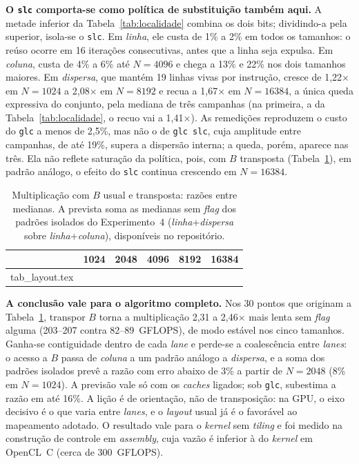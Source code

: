 \documentclass[12pt]{article}
\makeatletter
\newcommand{\tabinput}[1]{\@@input #1.tex }
\makeatother
\begin{document}
\textbf{O \texttt{slc} comporta-se como política de substituição também aqui.}
A metade inferior da Tabela~\ref{tab:localidade} combina os dois bits;
dividindo-a pela superior, isola-se o \texttt{slc}. Em \textit{linha}, ele custa
de 1\% a 2\% em todos os tamanhos: o reúso ocorre em 16 iterações consecutivas,
antes que a linha seja expulsa. Em \textit{coluna}, custa de 4\% a 6\% até
$N=4096$ e chega a 13\% e 22\% nos dois tamanhos maiores. Em \textit{dispersa},
que mantém 19 linhas vivas por instrução, cresce de 1,22$\times$ em $N=1024$ a
2,08$\times$ em $N=8192$ e recua a 1,67$\times$ em $N=16384$, a única queda expressiva do
conjunto, pela mediana de três campanhas (na primeira, a da
Tabela~\ref{tab:localidade}, o recuo vai a 1,41$\times$). As remedições
reproduzem o custo do \texttt{glc} a menos de 2,5\%, mas não o de \texttt{glc
slc}, cuja amplitude entre campanhas, de até 19\%, supera a dispersão interna; a
queda, porém, aparece nas três. Ela não reflete saturação da política, pois, com
$B$ transposta (Tabela~\ref{tab:layout}), em padrão análogo, o efeito do
\texttt{slc} continua crescendo em $N=16384$.

\begin{table}[ht]
\centering
\caption{Multiplicação com $B$ usual e transposta: razões entre medianas. A
prevista soma as medianas sem \textit{flag} dos padrões isolados do
Experimento~4 (\textit{linha}+\textit{dispersa} sobre
\textit{linha}+\textit{coluna}), disponíveis no repositório.}
\label{tab:layout}
\footnotesize
\begin{tabular}{@{}lrrrrr@{}}
\toprule
 & \textbf{1024} & \textbf{2048} & \textbf{4096} & \textbf{8192} & \textbf{16384} \\
\midrule
\tabinput{tab_layout}
\bottomrule
\end{tabular}
\end{table}

\textbf{A conclusão vale para o algoritmo completo.} Nos 30 pontos que originam
a Tabela~\ref{tab:layout}, transpor $B$ torna a multiplicação
2,31 a 2,46$\times$ mais lenta sem \textit{flag} alguma (203--207 contra
82--89~GFLOPS), de modo estável nos cinco tamanhos. Ganha-se contiguidade dentro
de cada \textit{lane} e perde-se a coalescência entre \textit{lanes}: o acesso a
$B$ passa de \textit{coluna} a um padrão análogo a \textit{dispersa}, e a soma
dos padrões isolados prevê a razão com erro abaixo de 3\% a partir de $N=2048$
(8\% em $N=1024$). A previsão vale só com os \textit{caches} ligados; sob
\texttt{glc}, subestima a razão em até 16\%. A lição é de orientação, não de
transposição: na GPU, o eixo decisivo é o que varia entre \textit{lanes}, e o
\textit{layout} usual já é o favorável ao mapeamento adotado. O resultado vale
para o \textit{kernel} sem \textit{tiling} e foi medido na construção de
controle em \textit{assembly}, cuja vazão é inferior à do \textit{kernel} em
OpenCL~C (cerca de 300~GFLOPS).
\end{document}
